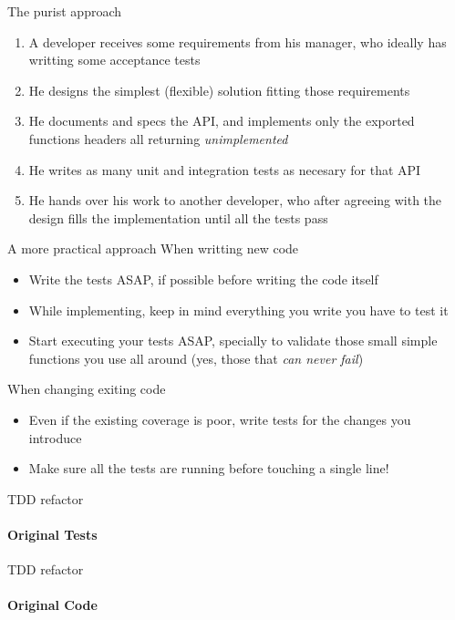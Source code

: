 \documentclass[aspectratio=169]{beamer}
\begin{document}
\begin{frame}{The purist approach}
    \begin{enumerate}
    \item A developer receives some requirements from his manager, who ideally has writting some acceptance tests
    \pause
    \item He designs the simplest (flexible) solution fitting those requirements
    \pause
    \item He documents and specs the API, and implements only the exported functions headers all returning \emph{unimplemented}
    \pause
    \item He writes as many unit and integration tests as necesary for that API
    \pause
    \item He hands over his work to another developer, who after agreeing with the design fills the implementation until
    all the tests pass
    \end{enumerate}
\end{frame}

\begin{frame}{A more practical approach}
    When writting new code
    \begin{itemize}
    \item Write the tests ASAP, if possible before writing the code itself
    \pause
    \item While implementing, keep in mind everything you write you have to test it
    \pause
    \item Start executing your tests ASAP, specially to validate those small simple functions you use all around (yes,
    those that \emph{can never fail})
    \end{itemize}
    \pause
    When changing exiting code
    \begin{itemize}
    \item Even if the existing coverage is poor, write tests for the changes you introduce
    \pause
    \item Make sure all the tests are running before touching a single line!
    \end{itemize}
\end{frame}

\begin{frame}{TDD refactor}
    \framesubtitle{Original Tests}
    
\end{frame}

\begin{frame}{TDD refactor}
    \framesubtitle{Original Code}
    
\end{frame}
\end{document}
